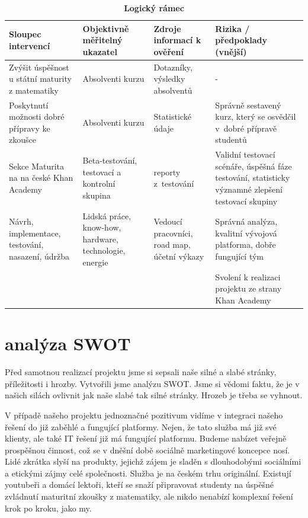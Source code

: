 \documentclass[12pt, a4paper]{report}
\begin{document}
\begin{table}[htbp]
\caption{\textbf{Logický rámec}}
\centering
\begin{tabularx}{\textwidth}{XXXX}
Sloupec intervencí & Objektivně měřitelný ukazatel & Zdroje informací k ověření & Rizika / předpoklady (vnější)\\
\hline
Zvýšit úspěšnost u státní maturity z matematiky & Absolventi kurzu & Dotazníky, výsledky absolventů & -\\
\hline
Poskytnutí možnosti dobré přípravy ke zkoušce & Absolventi kurzu & Statistické údaje & Správně sestavený kurz, který se osvědčil v dobré přípravě studentů\\
\hline
Sekce Maturita na na české Khan Academy & Beta-testování, testovací a  kontrolní skupina & reporty z testování & Validní testovací scénáře, úspěšná fáze testování, statisticky významné zlepšení testovací skupiny\\
\hline
Návrh, implementace, testování, nasazení, údržba & Lidská práce, know-how, hardware, technologie, energie & Vedoucí pracovníci, road map, účetní výkazy & Správná analýza, kvalitní vývojová platforma, dobře fungující tým\\
\hline
 &  &  & Svolení k realizaci projektu ze strany Khan Academy\\
\end{tabularx}
\end{table}

\chapter{analýza SWOT}
Před samotnou realizací projektu jsme si sepsali naše silné a slabé stránky, příležitosti i hrozby. Vytvořili jsme analýzu SWOT. Jsme si vědomi faktu, že je v našich silách ovlivnit jak naše slabé tak silné stránky. Hrozeb je třeba se vyhnout.

V případě našeho projektu jednoznačné pozitivum vidíme v integraci našeho řešení do již zaběhlé a fungující platformy. Nejen, že tato služba má již své klienty, ale také IT řešení již má fungující platformu. Budeme nabízet veřejně prospěšnou činnost, což se v dněšní době sociálně marketingové koncepce nosí. Lidé zkrátka slyší na produkty, jejichž zájem je sladěn s dlouhodobými sociálními a etickými zájmy celé společnosti. Služba je na českém trhu originální. Existují youtubeři a domácí lektoři, kteří se snaží připravovat studenty na úspěšné zvládnutí maturitní zkoušky z matematiky, ale nikdo nenabízí komplexní řešení krok po kroku, jako my.
\end{document}
